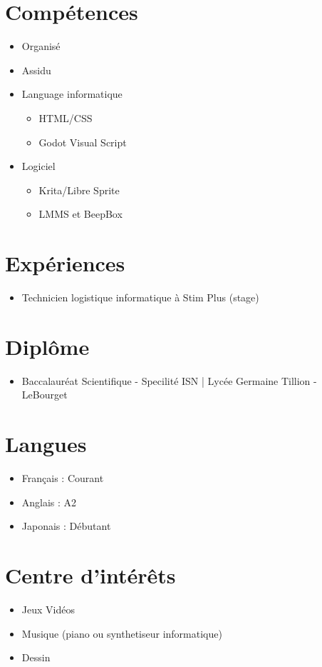 \documentclass[11pt,a4paper,sans]{moderncv}
\begin{document}
	\makecvtitle
	
	\section{Compétences}
		\begin{itemize}
			\item Organisé
			\item Assidu
			\item Language informatique
				\begin{itemize}
					\item HTML/CSS
					\item Godot Visual Script
				\end{itemize}
			\item Logiciel
				\begin{itemize}
					\item Krita/Libre Sprite
					\item LMMS et BeepBox
				\end{itemize}
		\end{itemize}
	\section{Expériences}
		\begin{itemize}
			\item Technicien logistique informatique à Stim Plus (stage)
		\end{itemize}
	\section{Diplôme}
		\begin{itemize}
			\item Baccalauréat Scientifique - Specilité ISN | Lycée Germaine Tillion - LeBourget
		\end{itemize}
	\section{Langues}
		\begin{itemize}
			\item Français : Courant
			\item Anglais : A2
			\item Japonais : Débutant
		\end{itemize}
	\section{Centre d'intérêts}
		\begin{itemize}
			\item Jeux Vidéos
			\item Musique (piano ou synthetiseur informatique)
			\item Dessin
		\end{itemize}
	
\end{document}

